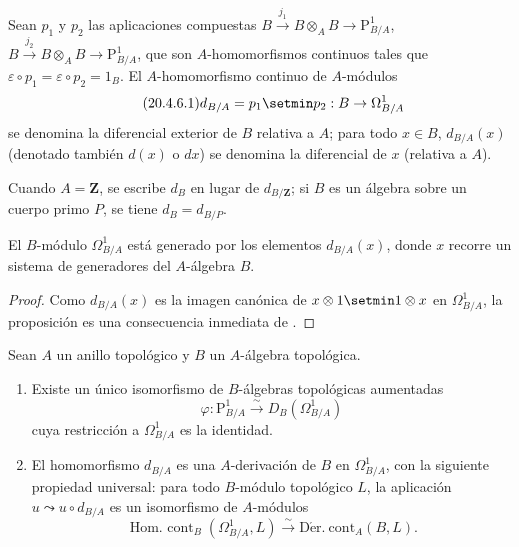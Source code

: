 \begin{definition}[20.4.6]
\label{0.20.4.6-fr}
Sean $p_1$ y $p_2$ las aplicaciones compuestas
$B\xrightarrow{j_1}B\otimes_A B\to\mathrm{P}^1_{B/A}$,
$B\xrightarrow{j_2}B\otimes_A B\to\mathrm{P}^1_{B/A}$, que son
$A$-homomorfismos continuos tales que
$\varepsilon\circ p_1=\varepsilon\circ p_2=1_B$. El
$A$-homomorfismo continuo de $A$-módulos
\begin{equation}
\tag{20.4.6.1}
\label{0.20.4.6.1-fr}
  d_{B/A}=p_1\setmin p_2:B\to\Omega^1_{B/A}
\end{equation}
se denomina la diferencial exterior de $B$ relativa a $A$; para
todo $x\in B$, $d_{B/A}(x)$ (denotado también $d(x)$ o $dx$) se denomina la
diferencial de $x$ (relativa a $A$).
\end{definition}

Cuando $A=\mathbf{Z}$, se escribe $d_B$ en lugar de $d_{B/\mathbf{Z}}$; si $B$
es un álgebra sobre un cuerpo primo $P$, se tiene $d_B=d_{B/P}$.

\begin{proposition}[20.4.7]
\label{0.20.4.7-fr}
El $B$-módulo $\Omega^1_{B/A}$ está generado por los elementos $d_{B/A}(x)$,
donde $x$ recorre un sistema de generadores del $A$-álgebra $B$.
\end{proposition}

\begin{proof}
Como $d_{B/A}(x)$ es la imagen canónica de $x\otimes1\setmin 1\otimes x$ en
$\Omega^1_{B/A}$, la proposición es una consecuencia inmediata de
.
\end{proof}

\begin{theorem}[20.4.8]
\label{0.20.4.8-fr}
Sean $A$ un anillo topológico y $B$ un $A$-álgebra topológica.
\begin{enumerate}
  \item[\rm(i)] Existe un único isomorfismo de $B$-álgebras topológicas
  aumentadas
\begin{equation}
\tag{20.4.8.1}
\label{0.20.4.8.1-fr}
  \varphi:\mathrm{P}^1_{B/A}\xrightarrow{\sim}D_B(\Omega^1_{B/A})
\end{equation}
cuya restricción a $\Omega^1_{B/A}$ es la identidad.
  \item[\rm(ii)] El homomorfismo $d_{B/A}$ es una $A$-derivación de $B$
  en $\Omega^1_{B/A}$, con la siguiente propiedad universal: para todo
  $B$-módulo topológico $L$, la aplicación $u\leadsto u\circ d_{B/A}$ es
  un isomorfismo de $A$-módulos
\begin{equation}
\tag{20.4.8.2}
\label{0.20.4.8.2-fr}
  \operatorname{Hom.\ cont}_B(\Omega^1_{B/A},L)
  \xrightarrow{\sim}\operatorname{D\acute{e}r.\ cont}_A(B,L).
\end{equation}
\end{enumerate}
\end{theorem}

